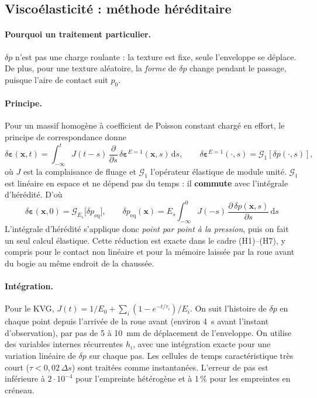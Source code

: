 \documentclass[11pt,a4paper]{article}
\newcommand{\dd}{\mathrm{d}}
\renewcommand{\epsilon}{\varepsilon}
\begin{document}
\subsection{Viscoélasticité : méthode héréditaire}\label{sec:hered}
\paragraph{Pourquoi un traitement particulier.} $\delta p$ n'est pas une charge roulante : la
texture est fixe, seule l'enveloppe se déplace. De plus, pour une texture aléatoire, la
\emph{forme} de $\delta p$ change pendant le passage, puisque l'aire de contact suit $p_0$.
\paragraph{Principe.} Pour un massif homogène à coefficient de Poisson constant chargé en effort,
le principe de correspondance donne
\begin{equation}
\delta\bm\epsilon(\bm x,t)=\int_{-\infty}^{t}J(t-s)\,\frac{\partial}{\partial s}\,\delta\bm\epsilon^{E=1}(\bm x,s)\,\dd s,
\qquad \delta\bm\epsilon^{E=1}(\cdot,s)=\mathcal G_1[\delta p(\cdot,s)],
\end{equation}
où $J$ est la complaisance de fluage et $\mathcal G_1$ l'opérateur élastique de module unité.
$\mathcal G_1$ est linéaire en espace et ne dépend pas du temps : il \textbf{commute} avec
l'intégrale d'hérédité. D'où
\begin{equation}
\boxed{\;\delta\bm\epsilon(\bm x,0)=\mathcal G_{E_s}\bigl[\delta p_{\text{eq}}\bigr],\qquad
\delta p_{\text{eq}}(\bm x)=E_s\int_{-\infty}^{0}J(-s)\,\frac{\partial\,\delta p(\bm x,s)}{\partial s}\,\dd s\;}
\label{eq:hered}
\end{equation}
L'intégrale d'hérédité s'applique donc \emph{point par point à la pression}, puis on fait un seul
calcul élastique. Cette réduction est exacte dans le cadre (H1)--(H7), y compris pour le contact
non linéaire et pour la mémoire laissée par la roue avant du bogie au même endroit de la chaussée.
\paragraph{Intégration.} Pour le KVG,
$J(t)=1/E_0+\sum_i(1-e^{-t/\tau_i})/E_i$. On suit l'histoire de $\delta p$ en chaque point depuis
l'arrivée de la roue avant (environ \SI{4}{s} avant l'instant d'observation), par pas de 5 à
\SI{10}{mm} de déplacement de l'enveloppe. On utilise des variables internes récurrentes
$h_i$, avec une intégration exacte pour une variation linéaire de $\delta p$ sur chaque pas. Les
cellules de temps caractéristique très court ($\tau<0{,}02\,\Delta s$) sont traitées comme
instantanées. L'erreur de pas est inférieure à $2\cdot10^{-4}$ pour l'empreinte hétérogène et à
1\,\% pour les empreintes en créneau.
\end{document}
